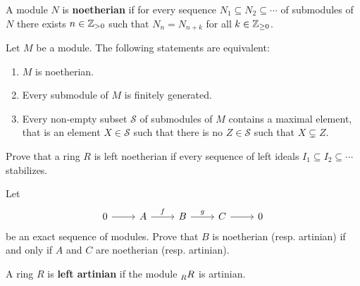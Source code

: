 A module $N$ is \textbf{noetherian} if for every sequence 
$N_1\subseteq N_2\subseteq\cdots$ of submodules of $N$ there exists $n\in\mathbb{Z}_{>0}$ such that 
$N_n=N_{n+k}$ for all $k\in\mathbb{Z}_{\geq0}$. 


\begin{exercise}
    Let $M$ be a module. The following statements are equivalent:
    \begin{enumerate}
        \item $M$ is noetherian.
        \item Every submodule of $M$ is finitely generated. 
        \item Every non-empty subset $\mathcal{S}$ of submodules of $M$ contains a maximal element, that is
            an element $X\in\mathcal{S}$ such that there is no $Z\in\mathcal{S}$ such that $X\subsetneq Z$.  
    \end{enumerate}
\end{exercise}

\begin{exercise}
    Prove that a ring $R$ is left noetherian if every sequence of 
    left ideals $I_1\subseteq I_2\subseteq\cdots$ stabilizes. 
\end{exercise}

\begin{exercise}
\label{xca:AN_exact}
	Let 
	\[
	\begin{tikzcd}
		0 \arrow{r}
		& A \arrow{r}{f}
		& B \arrow{r}{g}
		& C \arrow{r}
		& 0
	\end{tikzcd}
	\]
	be an exact sequence of modules. Prove that $B$ is noetherian (resp.
	artinian) if and only if $A$ and $C$ are noetherian (resp. artinian).
\end{exercise}


\begin{definition}
	A ring $R$ is \textbf{left artinian} if the module 
	$\prescript{}{R}R$ is artinian.
\end{definition}


